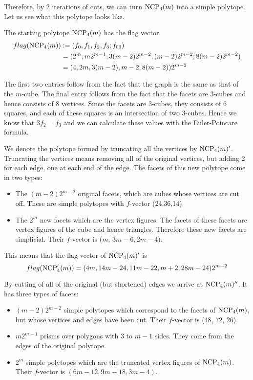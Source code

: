 Therefore, by 2 iterations of cuts, we can turn $\textrm{NCP}_4(m)$ into a simple 
polytope. Let us see what this polytope looks like. 

The starting polytope $\textrm{NCP}_4(m)$ has the flag vector 
\begin{align*}
 flag(\textrm{NCP}_4(m)) &:= (f_0, f_1, f_2, f_3; f_{03}) \\
	&= (2^m, m2^{m-1}, 3(m-2)2^{m-2}, (m-2)2^{m-2}; 8(m-2)2^{m-2}) \\
	&= (4, 2m, 3(m-2), m-2; 8(m-2))2^{m-2}
\end{align*}

The first two entries follow from the fact that the graph is the same as that 
of the $m$-cube. The final entry follows from the fact that the facets are 
3-cubes and hence consists of 8 vertices. Since the facets are 3-cubes, they 
consists of 6 squares, and each of these squares is an intersection of two 
3-cubes. Hence we know that $3f_2 = f_3$ and we can calculate these values with 
the Euler-Poincare formula.

We denote the polytope formed by truncating all the vertices by $\textrm{NCP}_4(m)'$.
Truncating the vertices means removing all of the original vertices, but 
adding 2 for each edge, one at each end of the edge. The facets of this new 
polytope come in two types:

\begin{itemize}
 \item The $(m-2)2^{m-2}$ original facets, which are cubes whose vertices are 
cut off. These are simple polytopes with $f$-vector (24,36,14).
 \item The $2^m$ new facets which are the vertex figures. The facets of these 
facets are vertex figures of the cube and hence triangles. Therefore these 
new facets are simplicial. Their $f$-vector is ($m$, 
$3m-6, 2m-4)$.
\end{itemize}

This means that the flag vector of $\textrm{NCP}_4(m)'$ is 
\begin{equation}
 flag(\textrm{NCP}'_4(m)) = (4m, 14m-24, 11m-22, m+2; 28m-24)2^{m-2}
\end{equation}

By cutting of all of the original (but shortened) edges we arrive at 
$\textrm{NCP}_4(m)''$. It has three types of facets:

\begin{itemize}
 \item $(m-2)2^{m-2}$ simple polytopes which correspond to the facets of 
$\textrm{NCP}_4(m)$, but whose vertices and edges have been cut. Their $f$-vector is 
(48, 72, 26).
\item $m2^{m-1}$ prisms over polygons with $3$ to $m-1$ sides. They come from 
the edges of the original polytope.
\item $2^m$ simple polytopes which are the truncated vertex figures of 
$\textrm{NCP}_4(m)$. Their $f$-vector is $(6m - 12, 9m-18, 3m-4)$.
\end{itemize}

